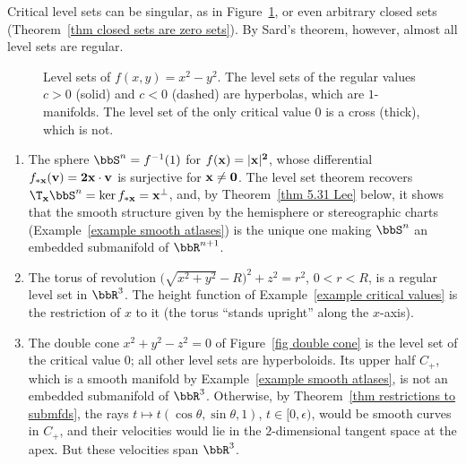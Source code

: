 Critical level sets can be singular, as in Figure~\ref{fig level sets}, or even arbitrary closed sets (Theorem~\ref{thm closed sets are zero sets}). By Sard's theorem, however, almost all level sets are regular.

\begin{figure}[tp]
    \centering
    \caption{Level sets of $f(x,y)=x^2-y^2$. The level sets of the regular values $c>0$ (solid) and $c<0$ (dashed) are hyperbolas, which are $1$-manifolds. The level set of the only critical value $0$ is a cross (thick), which is not.}
    \label{fig level sets}
\end{figure}

\begin{example}\label{example level sets}
    \begin{enumerate}
        \item The sphere $\bbS^n=f^{-1}(1)$ for $f(\bf{x})=\lvert\bf{x}\rvert^2$, whose differential $f_{\ast\bf{x}}(\bf{v})=2\bf{x}\cdot\bf{v}$ is surjective for $\bf{x}\neq0$. The level set theorem recovers $\T_{\bf{x}}\bbS^n=\ker f_{\ast\bf{x}}=\bf{x}^\perp$, and, by Theorem~\ref{thm 5.31 Lee} below, it shows that the smooth structure given by the hemisphere or stereographic charts (Example~\ref{example smooth atlases}) is the unique one making $\bbS^n$ an embedded submanifold of $\bbR^{n+1}$.
        \item The torus of revolution $\big(\sqrt{x^2+y^2}-R\big)^2+z^2=r^2$, $0<r<R$, is a regular level set in $\bbR^3$. The height function of Example~\ref{example critical values} is the restriction of $x$ to it (the torus ``stands upright'' along the $x$-axis).
        \item The double cone $x^2+y^2-z^2=0$ of Figure~\ref{fig double cone} is the level set of the critical value $0$; all other level sets are hyperboloids. Its upper half $C_+$, which is a smooth manifold by Example~\ref{example smooth atlases}, is not an embedded submanifold of $\bbR^3$. Otherwise, by Theorem~\ref{thm restrictions to submfds}, the rays $t\mapsto t(\cos\theta,\sin\theta,1)$, $t\in[0,\epsilon)$, would be smooth curves in $C_+$, and their velocities would lie in the $2$-dimensional tangent space at the apex. But these velocities span $\bbR^3$.
    \end{enumerate}
\end{example}

